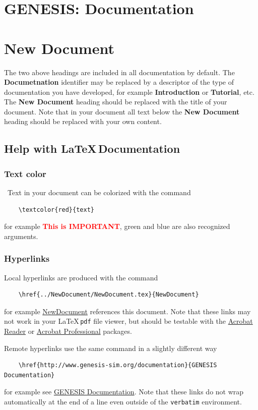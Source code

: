 \documentclass[12pt]{article}
\begin{document}
\section*{GENESIS: Documentation}

\section*{New Document}

The two above headings are included in all documentation by default. The {\bf Documetnation} identifier may be replaced by a descriptor of the type of documentation you have developed, for example {\bf Introduction} or {\bf Tutorial}, etc. The {\bf New Document} heading should be replaced with the title of your document. Note that in your document all text below the {\bf New Document} heading should be replaced with your own content.

\subsection*{Help with \LaTeX\,Documentation}

\subsubsection*{Text color}
\
Text in your document can be colorized  with the command
\begin{verbatim}
    \textcolor{red}{text}
\end{verbatim}
for example \textcolor{red}{\bf This is IMPORTANT}, green and blue are also recognized arguments.

\subsubsection*{Hyperlinks}

Local hyperlinks are produced with the command
\begin{verbatim}
    \href{../NewDocument/NewDocument.tex}{NewDocument}
\end{verbatim}
for example \href{../NewDocument/NewDocument.tex}{NewDocument} references this document.
Note that these links may not work in your \LaTeX\,{\tt pdf} file viewer, but should be testable with the \href{http://get.adobe.com/reader/}{Acrobat Reader} or \href{http://www.adobe.com/products/acrobatpro/tryout.html}{Acrobat Professional} packages.


Remote hyperlinks use the same command in a slightly different way
\begin{verbatim}
    \href{http://www.genesis-sim.org/documentation}{GENESIS Documentation}
\end{verbatim}
for example see \href{http://www.genesis-sim.org/documentation}{GENESIS Documentation}. Note that these links do not wrap automatically at the end of a line even outside of the {\tt verbatim} environment.
\end{document}

